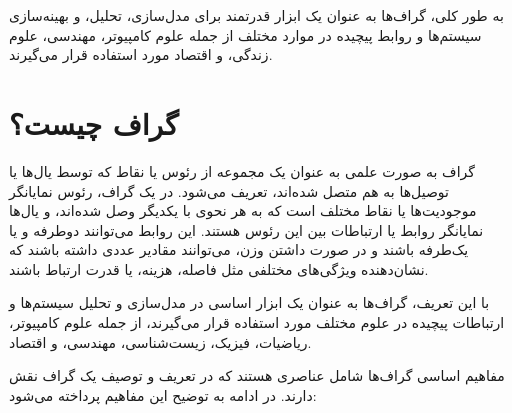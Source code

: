 \documentclass[a4paper,10pt]{book}
\begin{document}
        به طور کلی، گراف‌ها به عنوان یک ابزار قدرتمند برای مدل‌سازی، تحلیل، و بهینه‌سازی سیستم‌ها و روابط پیچیده در موارد مختلف از جمله علوم کامپیوتر، مهندسی، علوم زندگی، و اقتصاد مورد استفاده قرار می‌گیرند.

        \section{گراف چیست؟}

            گراف به صورت علمی به عنوان یک مجموعه از رئوس یا نقاط که توسط یال‌ها یا توصیل‌ها به هم متصل شده‌اند، تعریف می‌شود. در یک گراف، رئوس نمایانگر موجودیت‌ها یا نقاط مختلف است که به هر نحوی با یکدیگر وصل شده‌اند، و یال‌ها نمایانگر روابط یا ارتباطات بین این رئوس هستند. این روابط می‌توانند دوطرفه و یا یک‌طرفه باشند و در صورت داشتن وزن، می‌توانند مقادیر عددی داشته باشند که نشان‌دهنده ویژگی‌های مختلفی مثل فاصله، هزینه، یا قدرت ارتباط باشند.

            با این تعریف، گراف‌ها به عنوان یک ابزار اساسی در مدل‌سازی و تحلیل سیستم‌ها و ارتباطات پیچیده در علوم مختلف مورد استفاده قرار می‌گیرند، از جمله علوم کامپیوتر، ریاضیات، فیزیک، زیست‌شناسی، مهندسی، و اقتصاد.

            مفاهیم اساسی گراف‌ها شامل عناصری هستند که در تعریف و توصیف یک گراف نقش دارند. در ادامه به توضیح این مفاهیم پرداخته می‌شود:
\end{document}
